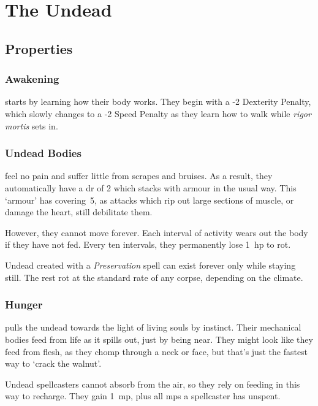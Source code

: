 \section[The Undead]{The Undead \D}
\label{undead}
\begin{multicols}{2}
\subsection{Properties}

\subsubsection{Awakening}
starts by learning how their body works.
They begin with a -2 Dexterity Penalty, which slowly changes to a -2 Speed Penalty as they learn how to walk while \textit{rigor mortis} sets in.

\subsubsection{Undead Bodies}
feel no pain and suffer little from scrapes and bruises.
As a result, they automatically have a \gls{dr} of 2 which stacks with armour in the usual way.%
This `armour' has \gls{covering}~5, as attacks which rip out large sections of muscle, or damage the heart, still debilitate them.

However, they cannot move forever.
Each \gls{interval} of activity wears out the body if they have not fed.
Every ten \glspl{interval}, they permanently lose 1~\gls{hp} to rot.

Undead created with a \textit{Preservation} spell can exist forever only while staying still.
The rest rot at the standard rate of any corpse, depending on the climate.

\subsubsection{Hunger}
pulls the undead towards the light of living souls by instinct.
Their mechanical bodies feed from life as it spills out, just by being near.
They might look like they feed from flesh, as they chomp through a neck or face, but that's just the fastest way to `crack the walnut'.

Undead spellcasters cannot absorb  from the air, so they rely on feeding in this way to recharge.
They gain 1~\gls{mp}, plus all \glspl{mp} a spellcaster has unspent.


\end{multicols}
